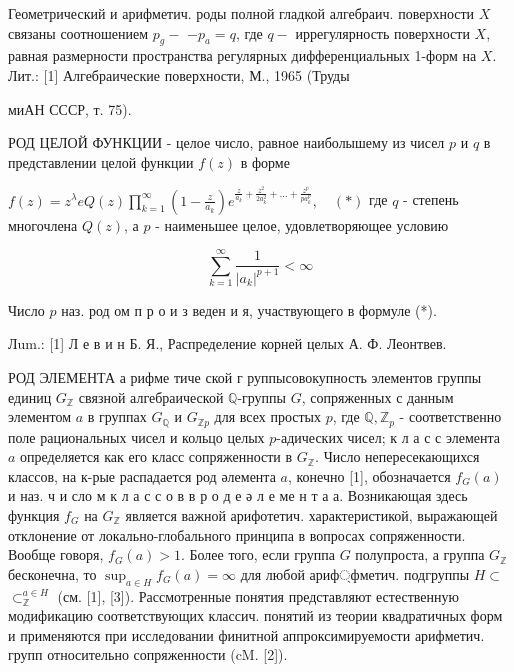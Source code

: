 \documentclass[10pt]{article}
\begin{document}
Геометрический и арифметич. роды полной гладкой алгебраич. поверхности $X$ связаны соотношением $p_{g}-$ $-p_{a}=q$, где $q-$ иррегулярность поверхности $X$, равная размерности пространства регулярных дифференциальных 1-форм на $X$. Лит.: [1] Алгебраические поверхности, М., 1965 (Труды

миАН СССР, т. 75).



РОД ЦЕЛОЙ ФУНКЦИИ - целое число, равное наиболышему из чисел $p$ и $q$ в представлении целой функции $f(z)$ в форме



$f(z)=z^{\lambda} e Q(z) \prod_{k=1}^{\infty}\left(1-\frac{z}{a_{k}}\right) e^{\frac{z}{a_{k}}+\frac{z^{2}}{2 a_{k}^{2}}+\ldots+\frac{z^{p}}{p a_{k}^{p}}}, \quad(*)$ где $q$ - степень многочлена $Q(z)$, а $p$ - наименьшее целое, удовлетворяющее условию



\[

\sum_{k=1}^{\infty} \frac{1}{\left|a_{k}\right|^{p+1}}<\infty

\]



Число $p$ наз. род ом п р о и з веден и я, участвующего в формуле (*).



Лum.: [1] Л е в и н Б. Я., Распределение корней целых А. Ф. Леонтвев.



РОД ЭЛЕМЕНТА а рифме тиче ской г руппысовокупность элементов группы единиц $G_{\mathbb{Z}}$ связной алгебраической $\mathbb{Q}$-группы $G$, сопряженных с данным элементом $a$ в группах $G_{\mathbb{Q}}$ и $G_{\mathbb{Z} p}$ для всех простых $p$, где $\mathbb{Q}, \mathbb{Z}_{p}$ - соответственно поле рациональных чисел и кольцо целых $p$-адических чисел; к л а с с элемента $a$ определяется как его класс сопряженности в $G_{\mathbb{Z}}$. Число непересекающихся классов, на к-рые распадается род әлемента $a$, конечно [1], обозначается $f_{G}(a)$ и наз. ч и сло м к л а с с о в в р о д е ә л е ме н т а $а$. Возникающая здесь функция $f_{G}$ на $G_{\mathbb{Z}}$ является важной арифотетич. характеристикой, выражающей отклонение от локально-глобального принципа в вопросах сопряженности. Вообще говоря, $f_{G}(a)>1$. Более того, если группа $G$ полупроста, а группа $G_{\mathbb{Z}}$ бесконечна, то $\sup _{a \in H} f_{G}(a)=\infty$ для любой ариф্фметич. подгруппы $H \subset$ $\subset_{\mathbb{Z}}^{a \in H}$ (см. [1], [3]). Рассмотренные понятия представляют естественную модификацию соответствующих классич. понятий из теории квадратичных форм и применяются при исследовании финитной аппроксимируемости арифметич. групп относительно сопряженности (cM. [2]).
\end{document}
